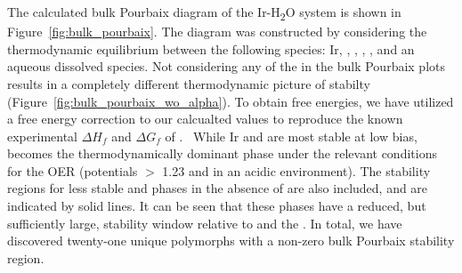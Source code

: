 %
%
The calculated bulk Pourbaix diagram of the Ir-H\textsubscript{2}O system is shown in Figure~\ref{fig:bulk_pourbaix}.
%
The diagram was constructed by considering the thermodynamic equilibrium between the following species: Ir, \rIrOtwo, \aIrOthree, \rIrOthree, \bIrOthree, and an aqueous dissolved  species. Not considering any of the \IrOthree in the bulk Pourbaix plots results in a completely different thermodynamic picture of \IrOtwo stabilty (Figure~\ref{fig:bulk_pourbaix_wo_alpha}).
%
To obtain free energies, we have utilized a free energy correction to our calcualted values to reproduce the known experimental $\Delta H_f$ and $\Delta G_f$ of \rIrOtwo.~\cite{Barin1995}  
%
While Ir and \rIrOtwo are most stable at low bias, \aIrOthree becomes the thermodynamically dominant phase under the relevant conditions for the OER (potentials $>$ 1.23 \VRHE and in an acidic environment).
%
The stability regions for less stable \bIrOthree and \rIrOthree phases in the absence of \aIrOthree are also included, and are indicated by solid lines. It can be seen that these phases have a reduced, but sufficiently large, stability window relative to \IrOtwo and the . In total, we have discovered twenty-one unique \IrOthree polymorphs with a non-zero bulk Pourbaix stability region. 
%


